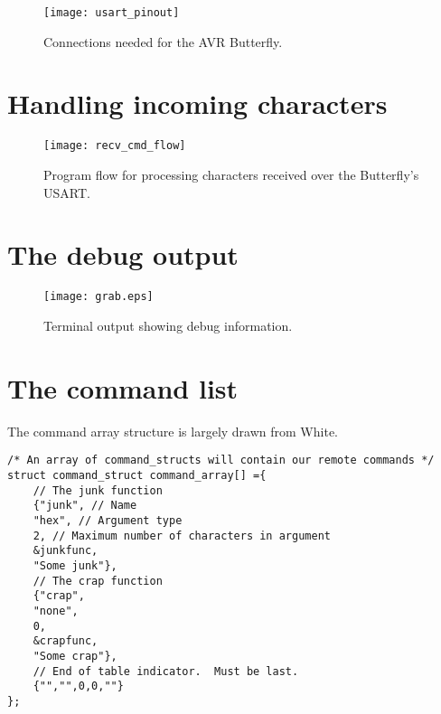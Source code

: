 \begin{figure}[ht]
    \begin{center}
        \texttt{[image: usart\_pinout]}
        \caption{Connections needed for the AVR Butterfly.\label{fig:connections}}
    \end{center}
\end{figure}

\clearpage
\section{Handling incoming characters}

\begin{figure}[ht]
    \begin{center}
        \texttt{[image: recv\_cmd\_flow]}
        \caption{Program flow for processing characters received over the Butterfly's USART.\label{fig:recflow}}
    \end{center}
\end{figure}

\clearpage{}
\section{The debug output}

\begin{figure}[ht]
    \begin{center}
        \texttt{[image: grab.eps]}
        \caption{Terminal output showing debug information.\label{fig:termgrab}}
    \end{center}
\end{figure}




\clearpage{}
\section{The command list}
The command array structure is largely drawn from White\cite{bok:white2012}.

\lstset{language=C}
\begin{lstlisting}[float, % Allows this listing to be a latex float
                   frame=single,
                   caption={Defining the command set with an array of
                            command structures.},
                   label=lst:cmdarray
                  ]
/* An array of command_structs will contain our remote commands */
struct command_struct command_array[] ={
    // The junk function
    {"junk", // Name
    "hex", // Argument type
    2, // Maximum number of characters in argument
    &junkfunc,
    "Some junk"},
    // The crap function
    {"crap",
    "none",
    0,
    &crapfunc,
    "Some crap"},
    // End of table indicator.  Must be last.
    {"","",0,0,""}
};
\end{lstlisting}

